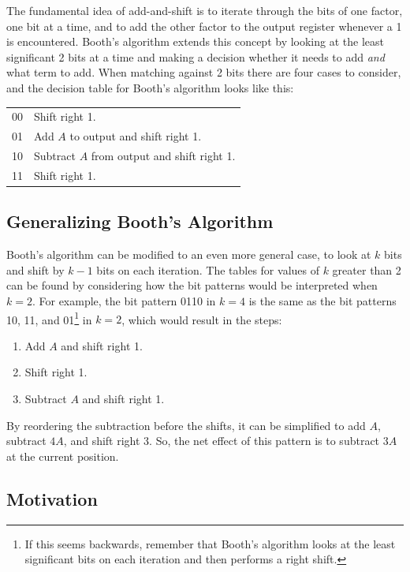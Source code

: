 \documentclass[12pt]{article}
\begin{document}
The fundamental idea of add-and-shift is to iterate through the bits of one
factor, one bit at a time, and to add the other factor to the output register
whenever a 1 is encountered. Booth's algorithm extends this concept by
looking at the least significant 2 bits at a time and making a decision whether
it needs to add \textit{and} what term to add. When matching against 2 bits
there are four cases to consider, and the decision table for Booth's algorithm
looks like this:

\vspace{12pt}
\begin{tabular}{|r|l|}
    \hline
    00 & Shift right 1. \\
    01 & Add $A$ to output and shift right 1. \\
    10 & Subtract $A$ from output and shift right 1. \\
    11 & Shift right 1. \\
    \hline
\end{tabular}
\vspace{12pt}

\subsection{Generalizing Booth's Algorithm}

Booth's algorithm can be modified to an even more general case, to look at $k$
bits and shift by $k - 1$ bits on each iteration. The tables for values of $k$
greater than 2 can be found by considering how the bit patterns would be
interpreted when $k = 2$. For example, the bit pattern 0110 in $k = 4$ is the
same as the bit patterns 10, 11, and 01\footnote{If this seems backwards,
remember that Booth's algorithm looks at the least significant bits on each
iteration and then performs a right shift.}
in $k = 2$, which would result in the steps:

\begin{enumerate}
    \item Add $A$ and shift right 1.
    \item Shift right 1.
    \item Subtract $A$ and shift right 1.
\end{enumerate}

By reordering the subtraction before the shifts, it can be simplified to add
$A$, subtract $4A$, and shift right 3. So, the net effect of this pattern is to
subtract $3A$ at the current position.

\subsection{Motivation}
\end{document}
